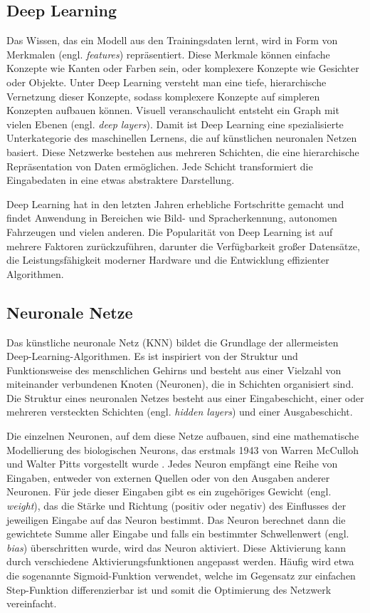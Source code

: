 \subsection{Deep Learning}

Das Wissen, das ein Modell aus den Trainingsdaten lernt, wird in Form von Merkmalen (engl. \textit{features}) repräsentiert. Diese Merkmale können einfache Konzepte wie Kanten oder Farben sein, oder komplexere Konzepte wie Gesichter oder Objekte. Unter Deep Learning versteht man eine tiefe, hierarchische Vernetzung dieser Konzepte, sodass komplexere Konzepte auf simpleren Konzepten aufbauen können. Visuell veranschaulicht entsteht ein Graph mit vielen Ebenen (engl. \textit{deep layers}). Damit ist Deep Learning eine spezialisierte Unterkategorie des maschinellen Lernens, die auf künstlichen neuronalen Netzen basiert. Diese Netzwerke bestehen aus mehreren Schichten, die eine hierarchische Repräsentation von Daten ermöglichen. Jede Schicht transformiert die Eingabedaten in eine etwas abstraktere Darstellung.

Deep Learning hat in den letzten Jahren erhebliche Fortschritte gemacht und findet Anwendung in Bereichen wie Bild- und Spracherkennung, autonomen Fahrzeugen und vielen anderen. Die Popularität von Deep Learning ist auf mehrere Faktoren zurückzuführen, darunter die Verfügbarkeit großer Datensätze, die Leistungsfähigkeit moderner Hardware und die Entwicklung effizienter Algorithmen.

\subsection{Neuronale Netze}

Das künstliche neuronale Netz (KNN) bildet die Grundlage der allermeisten Deep-Learning-Algorithmen. Es ist inspiriert von der Struktur und Funktionsweise des menschlichen Gehirns und besteht aus einer Vielzahl von miteinander verbundenen Knoten (Neuronen), die in Schichten organisiert sind. Die Struktur eines neuronalen Netzes besteht aus einer Eingabeschicht, einer oder mehreren versteckten Schichten (engl. \textit{hidden layers}) und einer Ausgabeschicht.

Die einzelnen Neuronen, auf dem diese Netze aufbauen, sind eine mathematische Modellierung des biologischen Neurons, das erstmals 1943 von Warren McCulloh und Walter Pitts vorgestellt wurde \parencite{Zhou2021}. Jedes Neuron empfängt eine Reihe von Eingaben, entweder von externen Quellen oder von den Ausgaben anderer Neuronen. Für jede dieser Eingaben gibt es ein zugehöriges Gewicht (engl. \textit{weight}), das die Stärke und Richtung (positiv oder negativ) des Einflusses der jeweiligen Eingabe auf das Neuron bestimmt. Das Neuron berechnet dann die gewichtete Summe aller Eingabe und falls ein bestimmter Schwellenwert (engl. \textit{bias}) überschritten wurde, wird das Neuron aktiviert. Diese Aktivierung kann durch verschiedene Aktivierungsfunktionen angepasst werden. Häufig wird etwa die sogenannte Sigmoid-Funktion verwendet, welche im Gegensatz zur einfachen Step-Funktion differenzierbar ist und somit die Optimierung des Netzwerk vereinfacht.


